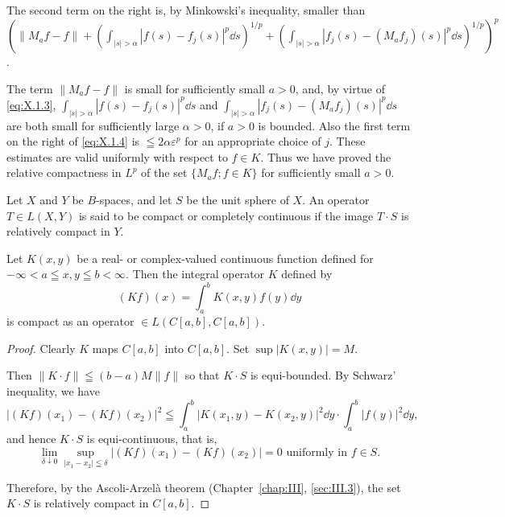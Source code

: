 The second term on the right is, by Minkowski's inequality, smaller than $\left(\|M_a f - f\| + \left(\int_{|s| > \alpha} |f(s) - f_j(s)|^p \dd s\right)^{1/p} + \left(\int_{|s| > \alpha} |f_j(s) - (M_a f_j)(s)|^p \dd s\right)^{1/p}\right)^p$. 

The term $\|M_{a}f - f\|$ is small for sufficiently small $a > 0$, and, by virtue of \eqref{eq:X.1.3}, $\int_{|s| > \alpha}|f(s) - f_j(s)|^p \dd s$ and $\int_{|s| > \alpha}|f_j(s) - (M_{a}f_j)(s)|^p \dd s$ are both small for sufficiently large $\alpha > 0$, if $a > 0$ is bounded. Also the first term on the right of \eqref{eq:X.1.4} is $\leqq 2\alpha\varepsilon^{p}$ for an appropriate choice of $j$. These estimates are valid uniformly with respect to $f \in K$. Thus we have proved the relative compactness in $L^{p}$ of the set $\{M_{a}f; f \in K\}$ for sufficiently small $a > 0$. 


\label{sec:X.2}

\begin{definition}\label{def:X.2.Definition.1} Let $X$ and $Y$ be $B$-spaces, and let $S$ be the unit sphere of $X$. An operator $T \in L(X, Y)$ is said to be compact or completely continuous if the image $T \cdot S$ is relatively compact in $Y$. 
\end{definition}

\begin{example}\label{ex:X.2.Example.1} Let $K(x, y)$ be a real- or complex-valued continuous function defined for $-\infty < a \leqq x, y \leqq b < \infty$. Then the integral operator $K$ defined by 
\begin{equation}\label{eq:X.2.1}
(K f) (x) = \int_{a} ^{b} K (x, y) f (y) \dd y
\end{equation}
is compact as an operator $\in L(C[a,b],C[a,b])$. 
\end{example}

\begin{proof}
 Clearly $K$ maps $C[a, b]$ into $C[a, b]$. Set $\sup |K(x, y)| = M$. 

Then $\| K \cdot f \| \leqq (b - a) M \| f \|$ so that $K \cdot S$ is equi-bounded. By Schwarz' inequality, we have 
\[
\left| (K f) \left(x _{1}\right) - (K f) \left(x _{2}\right) \right| ^{2} \leqq \int_{a} ^{b} \left| K \left(x _{1}, y\right) - K \left(x _{2}, y\right) \right| ^{2} \dd y \cdot \int_{a} ^{b} | f (y) | ^{2} \dd y,
\]
and hence $K \cdot S$ is equi-continuous, that is, 
\[
\lim\limits _{\delta \downarrow 0} \sup\limits _ {| x _{1} - x _{2} | \leqq \delta} | (K f) (x _{1}) - (K f) (x _{2}) | = 0 \text{ uniformly in } f \in S.
\]

Therefore, by the Ascoli-Arzelà theorem (Chapter~\ref{chap:III}, \ref{sec:III.3}), the set $K \cdot S$ is relatively compact in $C[a, b]$. 
\end{proof}

